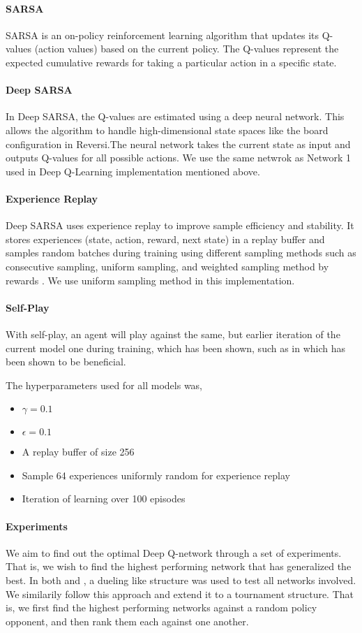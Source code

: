 \documentclass[../report.tex]{subfiles}
\begin{document}
\paragraph{SARSA}
SARSA is an on-policy reinforcement learning algorithm that updates its Q-values (action values) based on the current policy. The Q-values represent the expected cumulative rewards for taking a particular action in a specific state.

\paragraph{Deep SARSA}
In Deep SARSA, the Q-values are estimated using a deep neural network. This allows the algorithm to handle high-dimensional state spaces like the board configuration in Reversi.The neural network takes the current state as input and outputs Q-values for all possible actions. We use the same netwrok as Network 1 used in Deep Q-Learning implementation mentioned above.

\paragraph{Experience Replay}
Deep SARSA uses experience replay to improve sample efficiency and stability. It stores experiences (state, action, reward, next state) in a replay buffer and samples random batches during training using different sampling methods such as consecutive sampling, uniform sampling, and weighted sampling method by rewards \cite{7849837}. We use uniform sampling method in this implementation.

\paragraph{Self-Play}
With self-play, an agent will play against the same, but earlier iteration of the current model one during training, which has been shown, such as in \citet{ree13} which has been shown to be beneficial.

The hyperparameters used for all models was,
\begin{itemize}
    \item $\gamma=0.1$
    \item $\epsilon=0.1$
    \item A replay buffer of size 256
    \item Sample 64 experiences uniformly random for experience replay
    \item Iteration of learning over 100 episodes
\end{itemize}

\paragraph{Experiments}
We aim to find out the optimal Deep Q-network through a set of experiments. That is, we wish to find the highest performing network that has generalized the best. In both \citet{ree13} and \citet{VANECK20081999}, a dueling like structure was used to test all networks involved. We similarily follow this approach and extend it to a tournament structure. That is, we first find the highest performing networks against a random policy opponent, and then rank them each against one another.
\end{document}

